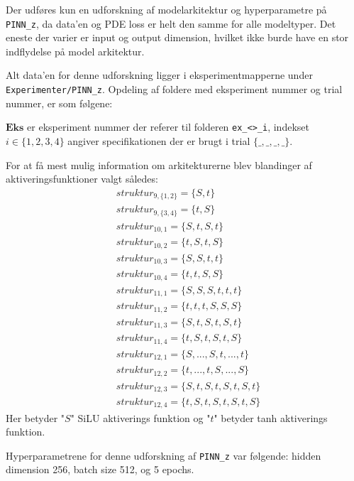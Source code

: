 Der udføres kun en udforskning af modelarkitektur og hyperparametre på \texttt{PINN\_z}, da data'en og PDE loss er helt den samme for alle modeltyper.
Det eneste der varier er input og output dimension, hvilket ikke burde have en stor indflydelse på model arkitektur. 


Alt data'en for denne udforskning ligger i eksperimentmapperne under \texttt{Experimenter/PINN\_z}. Opdeling af foldere med eksperiment nummer og trial nummer, er som følgene:

$\textbf{Eks}$ er eksperiment nummer der referer til folderen \texttt{ex\_<>\_i}, indekset $i \in \{1,2,3,4\}$ angiver specifikationen 
der er brugt i trial $\{\_,\_,\_,\_\}$. 

For at få mest mulig information om arkitekturerne blev blandinger af aktiveringsfunktioner valgt således:
\begin{align}
    &struktur_{9,\{1,2\}} = \{S,t\}\label{struk9_1}\\
    &struktur_{9,\{3,4\}} = \{t,S\}\label{struk9_3}\\
    &struktur_{10,1} = \{S,t,S,t\}\label{struk10_1}\\
    &struktur_{10,2} = \{t,S,t,S\}\label{struk10_2}\\
    &struktur_{10,3} = \{S,S,t,t\}\label{struk10_3}\\
    &struktur_{10,4} = \{t,t,S,S\}\label{struk10_4}\\
    &struktur_{11,1} = \{S,S,S,t,t,t\}\label{struk11_1}\\
    &struktur_{11,2} = \{t,t,t,S,S,S\}\label{struk11_2}\\
    &struktur_{11,3} = \{S,t,S,t,S,t\}\label{struk11_3}\\
    &struktur_{11,4} = \{t,S,t,S,t,S\}\label{struk11_4}\\
    &struktur_{12,1} = \{S,...,S,t,...,t\}\label{struk12_1}\\
    &struktur_{12,2} = \{t,...,t,S,...,S\}\label{struk12_2}\\
    &struktur_{12,3} = \{S,t,S,t,S,t,S,t\}\label{struk12_3}\\
    &struktur_{12,4} = \{t,S,t,S,t,S,t,S\}\label{struk12_4}
\end{align}\label{strukturer til arkitekturudforskning}
Her betyder "$S$" SiLU aktiverings funktion og "$t$" betyder tanh aktiverings funktion. 


Hyperparametrene for denne udforskning af \texttt{PINN\_z} var følgende: hidden dimension 256, batch size 512, og 5 epochs.

